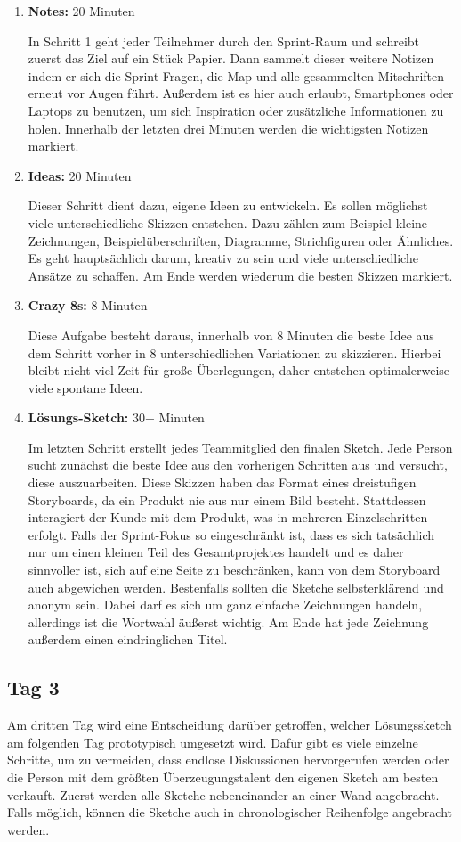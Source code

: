\begin{enumerate}
	\item \textbf{Notes:} 20 Minuten
	
	In Schritt 1 geht jeder Teilnehmer durch den Sprint-Raum und schreibt zuerst das Ziel auf ein Stück Papier. Dann sammelt dieser weitere Notizen indem er sich die Sprint-Fragen, die Map und alle gesammelten Mitschriften erneut vor Augen führt. Außerdem ist es hier auch erlaubt, Smartphones oder Laptops zu benutzen, um sich Inspiration oder zusätzliche Informationen zu holen. Innerhalb der letzten drei Minuten werden die wichtigsten Notizen markiert.
	\item \textbf{Ideas:} 20 Minuten
	
	Dieser Schritt dient dazu, eigene Ideen zu entwickeln. Es sollen möglichst viele unterschiedliche Skizzen entstehen. Dazu zählen zum Beispiel kleine Zeichnungen, Beispielüberschriften, Diagramme, Strichfiguren oder Ähnliches. Es geht hauptsächlich darum, kreativ zu sein und viele unterschiedliche Ansätze zu schaffen. Am Ende werden wiederum die besten Skizzen markiert.
	\item \textbf{Crazy 8s:} 8 Minuten
	
	Diese Aufgabe 	besteht daraus, innerhalb von 8 Minuten die beste Idee aus dem Schritt vorher in 8 unterschiedlichen Variationen zu skizzieren. Hierbei bleibt nicht viel Zeit für große Überlegungen, daher entstehen optimalerweise viele spontane Ideen.
	\item \textbf{Lösungs-Sketch:} 30+ Minuten
	
	Im letzten Schritt erstellt jedes Teammitglied den finalen Sketch. Jede Person sucht zunächst die beste Idee aus den vorherigen Schritten aus und versucht, diese auszuarbeiten. Diese Skizzen haben das Format eines dreistufigen Storyboards, da ein Produkt nie aus nur einem Bild besteht. Stattdessen interagiert der Kunde mit dem Produkt, was in mehreren Einzelschritten erfolgt. Falls der Sprint-Fokus so eingeschränkt ist, dass es sich tatsächlich nur um einen kleinen Teil des Gesamtprojektes handelt und es daher sinnvoller ist, sich auf eine Seite zu beschränken, kann von dem Storyboard auch abgewichen werden. Bestenfalls sollten die Sketche selbsterklärend und anonym sein. Dabei darf es sich um ganz einfache Zeichnungen handeln, allerdings ist die Wortwahl äußerst wichtig. Am Ende hat jede Zeichnung außerdem einen eindringlichen Titel.
\end{enumerate}

\subsection*{\label{sec:Sprint-Tag3}\thesubsection\quad Tag 3}
Am dritten Tag wird eine Entscheidung darüber getroffen, welcher Lösungssketch am folgenden Tag prototypisch umgesetzt wird. Dafür gibt es viele einzelne Schritte, um zu vermeiden, dass endlose Diskussionen hervorgerufen werden oder die Person mit dem größten Überzeugungstalent den eigenen Sketch am besten verkauft.
Zuerst werden alle Sketche nebeneinander an einer Wand angebracht. Falls möglich, können die Sketche auch in chronologischer Reihenfolge angebracht werden.

